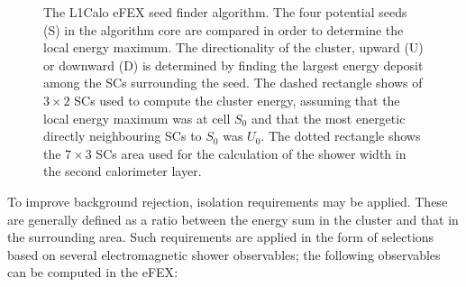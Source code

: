 \documentclass[cernpreprint, atlasdraft=false, UKenglish,british,orcidlogo, texmf, orcidlogo]{atlasdoc}
\begin{document}
\begin{figure}[htbp]
\centering
{}
\caption{\protect{}  The \gls{L1Calo} \gls{eFEX} seed finder algorithm.  The four potential seeds (S) in the algorithm core are compared in order to determine the local energy maximum.  The directionality of the cluster, upward (U) or downward (D) is determined by finding the largest energy deposit among the \glspl{SC} surrounding the seed.
\protect{} The dashed rectangle shows of $3 \times 2$ \glspl{SC} used to compute the cluster energy, assuming that the local energy maximum was at cell $S_0$ and that the most energetic directly neighbouring \glspl{SC} to $S_0$  was $U_0$.  The dotted rectangle shows the  $7 \times 3$ \glspl{SC}   area used for the calculation of the shower width in the second calorimeter layer.
}
\end{figure}
 
To improve background rejection, isolation requirements may be applied. These are generally defined as a ratio between the energy sum in the cluster and that in the surrounding area.  Such requirements are applied in the form of selections based on several electromagnetic shower observables; the following observables can be computed in the \gls{eFEX}:
 
\end{document}
